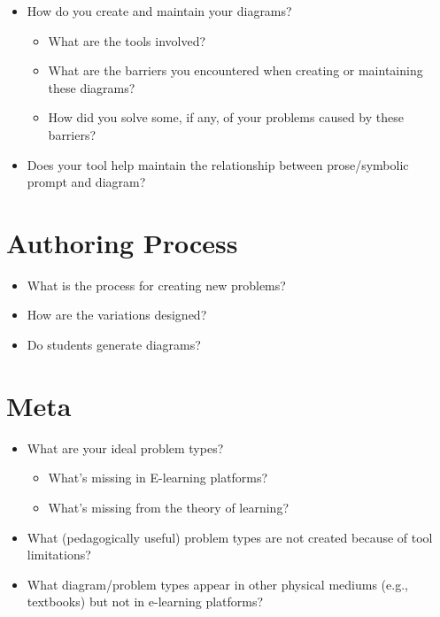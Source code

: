 \begin{itemize}
    \item How do you create and maintain your diagrams?
    \begin{itemize}
        \item What are the tools involved?
        \item What are the barriers you encountered when creating or maintaining these diagrams?
        \item How did you solve some, if any, of your problems caused by these barriers?
    \end{itemize}
    \item Does your tool help maintain the relationship between prose/symbolic prompt and diagram?
\end{itemize}

\section{Authoring Process}

\begin{itemize}
    \item What is the process for creating new problems?
    \item How are the variations designed?
    \item Do students generate diagrams?
\end{itemize}

\section{Meta}

\begin{itemize}
    \item What are your ideal problem types?
    \begin{itemize}
        \item What's missing in E-learning platforms?
        \item What's missing from the theory of learning?
    \end{itemize}
    \item What (pedagogically useful) problem types are not created because of tool limitations?
    \item What diagram/problem types appear in other physical mediums (e.g., textbooks) but not in e-learning platforms?
\end{itemize}